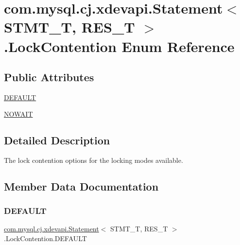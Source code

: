 \hypertarget{enumcom_1_1mysql_1_1cj_1_1xdevapi_1_1_statement_1_1_lock_contention}{}\section{com.\+mysql.\+cj.\+xdevapi.\+Statement$<$ S\+T\+M\+T\+\_\+T, R\+E\+S\+\_\+T $>$.Lock\+Contention Enum Reference}
\label{enumcom_1_1mysql_1_1cj_1_1xdevapi_1_1_statement_1_1_lock_contention}
\subsection*{Public Attributes}
\begin{DoxyCompactItemize}
\item 
\mbox{\hyperlink{enumcom_1_1mysql_1_1cj_1_1xdevapi_1_1_statement_1_1_lock_contention_abb0a621df8e8461830e15b6236f0d744}{D\+E\+F\+A\+U\+LT}}
\item 
\mbox{\hyperlink{enumcom_1_1mysql_1_1cj_1_1xdevapi_1_1_statement_1_1_lock_contention_aeee9ef730095721fb0fb801706ad6a7f}{N\+O\+W\+A\+IT}}
\end{DoxyCompactItemize}


\subsection{Detailed Description}
The lock contention options for the locking modes available. 

\subsection{Member Data Documentation}
\mbox{\label{enumcom_1_1mysql_1_1cj_1_1xdevapi_1_1_statement_1_1_lock_contention_abb0a621df8e8461830e15b6236f0d744}} 
\subsubsection{\texorpdfstring{D\+E\+F\+A\+U\+LT}{DEFAULT}}
{\footnotesize\ttfamily \mbox{\hyperlink{interfacecom_1_1mysql_1_1cj_1_1xdevapi_1_1_statement}{com.\+mysql.\+cj.\+xdevapi.\+Statement}}$<$ S\+T\+M\+T\+\_\+T, R\+E\+S\+\_\+T $>$.Lock\+Contention.\+D\+E\+F\+A\+U\+LT}


